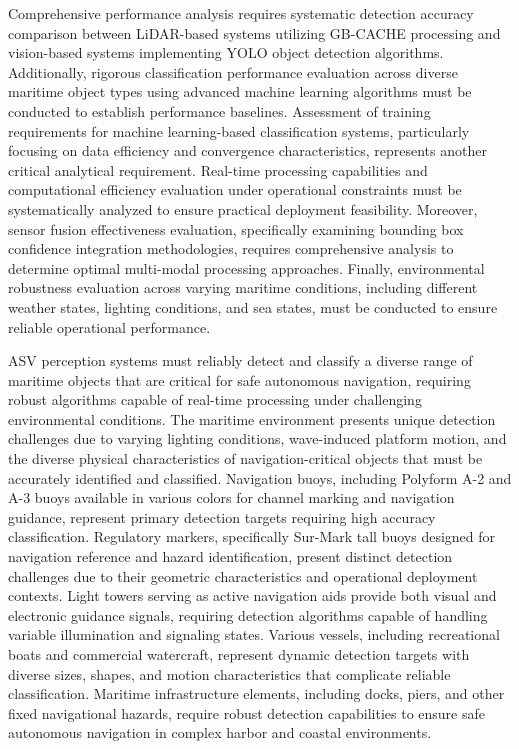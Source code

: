 \documentclass{erauthesis}
\begin{document}
Comprehensive performance analysis requires systematic detection accuracy comparison between \ac{LiDAR}-based systems utilizing \ac{GB-CACHE} processing and vision-based systems implementing \ac{YOLO} object detection algorithms. Additionally, rigorous classification performance evaluation across diverse maritime object types using advanced machine learning algorithms must be conducted to establish performance baselines. Assessment of training requirements for machine learning-based classification systems, particularly focusing on data efficiency and convergence characteristics, represents another critical analytical requirement. Real-time processing capabilities and computational efficiency evaluation under operational constraints must be systematically analyzed to ensure practical deployment feasibility. Moreover, sensor fusion effectiveness evaluation, specifically examining bounding box confidence integration methodologies, requires comprehensive analysis to determine optimal multi-modal processing approaches. Finally, environmental robustness evaluation across varying maritime conditions, including different weather states, lighting conditions, and sea states, must be conducted to ensure reliable operational performance.

\ac{ASV} perception systems must reliably detect and classify a diverse range of maritime objects that are critical for safe autonomous navigation, requiring robust algorithms capable of real-time processing under challenging environmental conditions. The maritime environment presents unique detection challenges due to varying lighting conditions, wave-induced platform motion, and the diverse physical characteristics of navigation-critical objects that must be accurately identified and classified. Navigation buoys, including Polyform A-2 and A-3 buoys available in various colors for channel marking and navigation guidance, represent primary detection targets requiring high accuracy classification. Regulatory markers, specifically Sur-Mark tall buoys designed for navigation reference and hazard identification, present distinct detection challenges due to their geometric characteristics and operational deployment contexts. Light towers serving as active navigation aids provide both visual and electronic guidance signals, requiring detection algorithms capable of handling variable illumination and signaling states. Various vessels, including recreational boats and commercial watercraft, represent dynamic detection targets with diverse sizes, shapes, and motion characteristics that complicate reliable classification. Maritime infrastructure elements, including docks, piers, and other fixed navigational hazards, require robust detection capabilities to ensure safe autonomous navigation in complex harbor and coastal environments.
\end{document}
